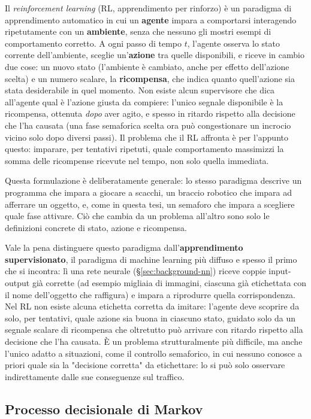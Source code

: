 Il \emph{reinforcement learning} (RL, apprendimento per rinforzo) è un
paradigma di apprendimento automatico in cui un \textbf{agente} impara a
comportarsi interagendo ripetutamente con un \textbf{ambiente}, senza che
nessuno gli mostri esempi di comportamento corretto. A ogni passo di
tempo $t$, l'agente osserva lo stato corrente dell'ambiente, sceglie
un'\textbf{azione} tra quelle disponibili, e riceve in cambio due cose:
un nuovo stato (l'ambiente è cambiato, anche per effetto dell'azione
scelta) e un numero scalare, la \textbf{ricompensa}, che indica quanto
quell'azione sia stata desiderabile in quel momento. Non esiste alcun
supervisore che dica all'agente qual è l'azione giusta da compiere:
l'unico segnale disponibile è la ricompensa, ottenuta \emph{dopo} aver
agito, e spesso in ritardo rispetto alla decisione che l'ha causata (una
fase semaforica scelta ora può congestionare un incrocio vicino solo
dopo diversi passi). Il problema che il RL affronta è per l'appunto
questo: imparare, per tentativi ripetuti, quale comportamento massimizzi
la somma delle ricompense ricevute nel tempo, non solo quella immediata.

Questa formulazione è deliberatamente generale: lo stesso paradigma
descrive un programma che impara a giocare a scacchi, un braccio robotico
che impara ad afferrare un oggetto, e, come in questa tesi, un
semaforo che impara a scegliere quale fase attivare. Ciò che cambia da un
problema all'altro sono solo le definizioni concrete di stato, azione e
ricompensa.

Vale la pena distinguere questo paradigma dall'\textbf{apprendimento
supervisionato}, il paradigma di machine learning più diffuso e spesso il
primo che si incontra: lì una rete neurale (§\ref{sec:background-nn})
riceve coppie input-output già corrette (ad esempio migliaia di immagini,
ciascuna già etichettata con il nome dell'oggetto che raffigura) e impara
a riprodurre quella corrispondenza. Nel RL non esiste alcuna etichetta
corretta da imitare: l'agente deve scoprire da solo, per tentativi, quale
azione sia buona in ciascuno stato, guidato solo da un segnale scalare di
ricompensa che oltretutto può arrivare con ritardo rispetto alla
decisione che l'ha causata. È un problema strutturalmente più difficile,
ma anche l'unico adatto a situazioni, come il controllo semaforico, in
cui nessuno conosce a priori quale sia la "decisione corretta" da
etichettare: lo si può solo osservare indirettamente dalle sue
conseguenze sul traffico.

\subsection{Processo decisionale di Markov}

